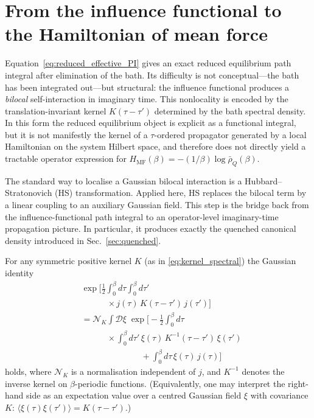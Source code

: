 \section{From the influence functional to the Hamiltonian of mean force}
\label{sec:hmf}

Equation~\eqref{eq:reduced_effective_PI} gives an exact reduced equilibrium path
integral after elimination of the bath. Its difficulty is not conceptual---the
bath has been integrated out---but structural: the influence functional produces
a \emph{bilocal} self-interaction in imaginary time. This nonlocality is encoded
by the translation-invariant kernel $K(\tau-\tau')$ determined by the bath
spectral density. In this form the reduced equilibrium object is explicit as a
functional integral, but it is not manifestly the kernel of a $\tau$-ordered
propagator generated by a local Hamiltonian on the system Hilbert space, and
therefore does not directly yield a tractable operator expression for
$H_{\mathrm{MF}}(\beta)=-(1/\beta)\log\bar\rho_Q(\beta)$.

The standard way to localise a Gaussian bilocal interaction is a
Hubbard--Stratonovich (HS) transformation. Applied here, HS replaces the bilocal
term by a linear coupling to an auxiliary Gaussian field. This step is the
bridge back from the influence-functional path integral to an operator-level
imaginary-time propagation picture. In particular, it produces exactly the
quenched canonical density introduced in Sec.~\ref{sec:quenched}.


For any symmetric positive kernel $K$ (as in \eqref{eq:kernel_spectral}) the
Gaussian identity
\begin{equation}
\begin{split}
    &\exp\!\bigg[
        \frac{1}{2}\int_0^\beta d\tau\int_0^\beta d\tau'
    \\
    &\qquad\quad\times
        j(\tau)\,K(\tau-\tau')\,j(\tau')
    \bigg]
    \\
    &=
    \mathcal N_K
    \int \mathcal D\xi\;
    \exp\bigg[
        -\frac{1}{2}\int_0^\beta d\tau
    \\
    &\qquad\quad\times
        \int_0^\beta d\tau'\,
        \xi(\tau)\,K^{-1}(\tau-\tau')\,\xi(\tau')
    \\
    &\qquad\qquad\qquad\quad
        +\int_0^\beta d\tau\,\xi(\tau)\,j(\tau)
    \bigg]
\end{split}
    \label{eq:HS_identity}
\end{equation}
holds, where $\mathcal N_K$ is a normalisation independent of $j$, and $K^{-1}$
denotes the inverse kernel on $\beta$-periodic functions. (Equivalently, one may
interpret the right-hand side as an expectation value over a centred Gaussian
field $\xi$ with covariance $K$:
$\langle\xi(\tau)\xi(\tau')\rangle = K(\tau-\tau')$.)

